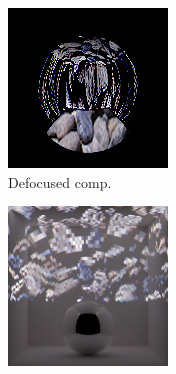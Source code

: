 \begin{figure}[]
\begin{subfigure}{\textwidth}
        \begin{subfigure}{0.32\textwidth}
            \centering
            \includegraphics[width=\textwidth]{images/04-experiment03/dof/defocused.jpg}
            \caption{Defocused comp.}
            \label{fig:ex03-dof-defocused_im}
        \end{subfigure}
        \hfill
        \begin{subfigure}{0.32\textwidth}
            \centering
            \includegraphics[width=\textwidth]{images/04-experiment03/dof/defocused_on_normal.jpg}

\end{subfigure}
\end{subfigure}
\end{figure}
